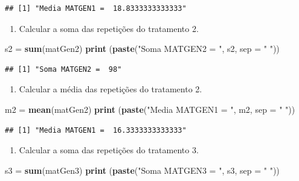 \documentclass[
]{article}
\newenvironment{Shaded}{\begin{snugshade}}{\end{snugshade}}
\newcommand{\DataTypeTok}[1]{\textcolor[rgb]{0.13,0.29,0.53}{#1}}
\newcommand{\KeywordTok}[1]{\textcolor[rgb]{0.13,0.29,0.53}{\textbf{#1}}}
\newcommand{\NormalTok}[1]{#1}
\newcommand{\StringTok}[1]{\textcolor[rgb]{0.31,0.60,0.02}{#1}}
\providecommand{\tightlist}{%
  \setlength{\itemsep}{0pt}\setlength{\parskip}{0pt}}
\begin{document}
\begin{verbatim}
## [1] "Media MATGEN1 =  18.8333333333333"
\end{verbatim}

\begin{enumerate}
\def\labelenumi{\arabic{enumi}.}
\setcounter{enumi}{3}
\tightlist
\item
  Calcular a soma das repetições do tratamento 2.
\end{enumerate}

\begin{Shaded}
\begin{Highlighting}[]
\NormalTok{s2 =}\StringTok{ }\KeywordTok{sum}\NormalTok{(matGen2)}
\KeywordTok{print}\NormalTok{ (}\KeywordTok{paste}\NormalTok{(}\StringTok{"Soma MATGEN2 = "}\NormalTok{, s2, }\DataTypeTok{sep =} \StringTok{" "}\NormalTok{))}
\end{Highlighting}
\end{Shaded}

\begin{verbatim}
## [1] "Soma MATGEN2 =  98"
\end{verbatim}

\begin{enumerate}
\def\labelenumi{\arabic{enumi}.}
\setcounter{enumi}{4}
\tightlist
\item
  Calcular a média das repetições do tratamento 2.
\end{enumerate}

\begin{Shaded}
\begin{Highlighting}[]
\NormalTok{m2 =}\StringTok{ }\KeywordTok{mean}\NormalTok{(matGen2)}
\KeywordTok{print}\NormalTok{ (}\KeywordTok{paste}\NormalTok{(}\StringTok{"Media MATGEN1 = "}\NormalTok{, m2, }\DataTypeTok{sep =} \StringTok{" "}\NormalTok{))}
\end{Highlighting}
\end{Shaded}

\begin{verbatim}
## [1] "Media MATGEN1 =  16.3333333333333"
\end{verbatim}

\begin{enumerate}
\def\labelenumi{\arabic{enumi}.}
\setcounter{enumi}{5}
\tightlist
\item
  Calcular a soma das repetições do tratamento 3.
\end{enumerate}

\begin{Shaded}
\begin{Highlighting}[]
\NormalTok{s3 =}\StringTok{ }\KeywordTok{sum}\NormalTok{(matGen3)}
\KeywordTok{print}\NormalTok{ (}\KeywordTok{paste}\NormalTok{(}\StringTok{"Soma MATGEN3 = "}\NormalTok{, s3, }\DataTypeTok{sep =} \StringTok{" "}\NormalTok{))}
\end{Highlighting}
\end{Shaded}
\end{document}
